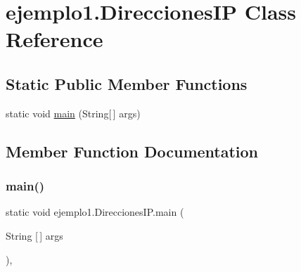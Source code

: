 \hypertarget{classejemplo1_1_1_direcciones_i_p}{}\section{ejemplo1.\+Direcciones\+IP Class Reference}
\label{classejemplo1_1_1_direcciones_i_p}
\subsection*{Static Public Member Functions}
\begin{DoxyCompactItemize}
\item 
static void \mbox{\hyperlink{classejemplo1_1_1_direcciones_i_p_ae53a0ef82dfe3ce922686ecf8dfad214}{main}} (String\mbox{[}$\,$\mbox{]} args)
\end{DoxyCompactItemize}


\subsection{Member Function Documentation}
\mbox{\label{classejemplo1_1_1_direcciones_i_p_ae53a0ef82dfe3ce922686ecf8dfad214}} 
\subsubsection{\texorpdfstring{main()}{main()}}
{\footnotesize\ttfamily static void ejemplo1.\+Direcciones\+I\+P.\+main (\begin{DoxyParamCaption}\item[{String \mbox{[}$\,$\mbox{]}}]{args }\end{DoxyParamCaption})\hspace{0.3cm}{\ttfamily [inline]}, {\ttfamily [static]}}


